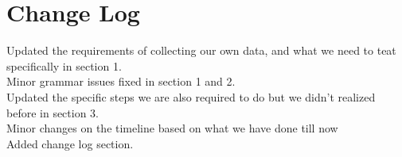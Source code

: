 \documentclass[10pt,draftclsnofoot,onecolumn,journal,compsoc]{IEEEtran}
\begin{document}
\section{Change Log}
Updated the requirements of collecting our own data, and what we need to teat specifically in section 1.\\
Minor grammar issues fixed in section 1 and 2.\\ 
Updated the specific steps we are also required to do but we didn't realized before in section 3.\\
Minor changes on the timeline based on what we have done till now\\
Added change log section.
\end{document}
